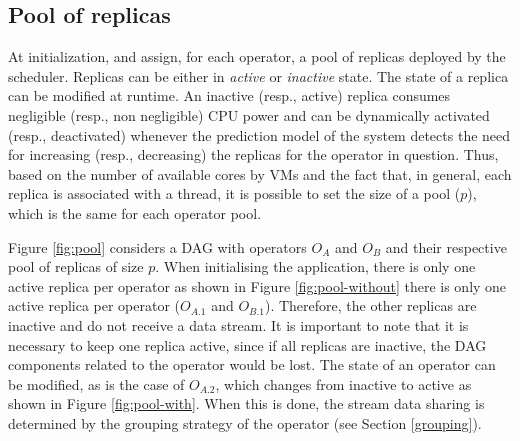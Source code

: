 \subsection{Pool of replicas}
\label{pool}

At initialization, \rSPS{} and \pSPS{} assign, for each operator, a pool of replicas deployed by the scheduler. Replicas can be either in  \textit{active} or \textit{inactive} state. The state of a replica can be modified at runtime. An inactive (resp., active) replica consumes negligible (resp., non negligible) CPU power and can be dynamically activated (resp., deactivated) whenever the prediction model of the system detects the need for increasing (resp., decreasing) the replicas for the operator in question. Thus, based on the number of available cores by VMs and the fact that, in general, each replica is associated with a thread, it is possible to set the size of a pool ($p$), which is the same for each operator pool. 

Figure \ref{fig:pool} considers a DAG with operators $O_A$ and $O_B$ and their respective pool of replicas of size $p$. When initialising the application, there is only one active replica per operator as shown in Figure \ref{fig:pool-without} there is only one active replica per operator ($O_{A.1}$ and $O_{B.1}$). Therefore, the other replicas are inactive and do not receive a data stream. It is important to note that it is necessary to keep one replica active, since if all replicas are inactive, the DAG components related to the operator would be lost. The state of an operator can be modified, as is the case of $O_{A.2}$, which changes from inactive to active as shown in Figure \ref{fig:pool-with}. When this is done, the stream data sharing is determined by the grouping strategy of the operator (see Section \ref{grouping}).

